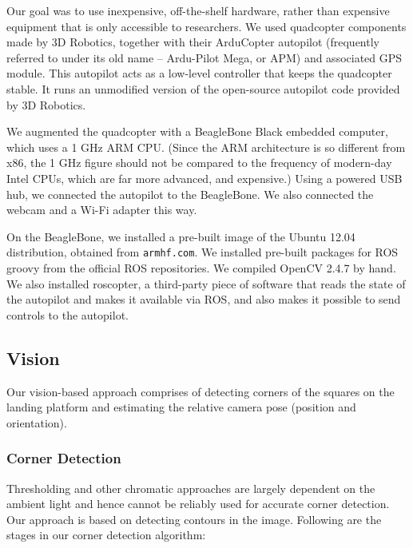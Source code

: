 \documentclass[10pt]{scrartcl} %
\begin{document}
Our goal was to use inexpensive, off-the-shelf hardware, rather than expensive
equipment that is only accessible to researchers. We used quadcopter components
made by 3D Robotics, together with their ArduCopter autopilot (frequently
referred to under its old name -- Ardu-Pilot Mega, or APM) and associated GPS
module. This autopilot acts as a low-level controller that keeps the quadcopter
stable. It runs an unmodified version of the open-source autopilot code
provided by 3D Robotics.

We augmented the quadcopter with a BeagleBone Black embedded computer, which
uses a 1 GHz ARM CPU. (Since the ARM architecture is so different from x86,
the 1 GHz figure should not be compared to the frequency of modern-day Intel
CPUs, which are far more advanced, and expensive.) Using a powered USB hub, we
connected the autopilot to the BeagleBone. We also connected the webcam and a
Wi-Fi adapter this way.


On the BeagleBone, we installed a pre-built image of the Ubuntu 12.04
distribution, obtained from {\tt armhf.com}. We installed pre-built packages
for ROS groovy from the official ROS repositories. We compiled OpenCV 2.4.7 by
hand. We also installed roscopter, a third-party piece of software that reads
the state of the autopilot and makes it available via ROS, and also makes it
possible to send controls to the autopilot.


\subsection{Vision}

Our vision-based approach comprises of detecting corners of the squares on the
landing platform and estimating the relative camera pose (position and orientation).

\subsubsection{Corner Detection}
Thresholding and other chromatic approaches are largely dependent on the ambient light
and hence cannot be reliably used for accurate corner detection. Our approach is based
on detecting contours in the image. Following are the stages in our corner detection
algorithm:
\end{document}
